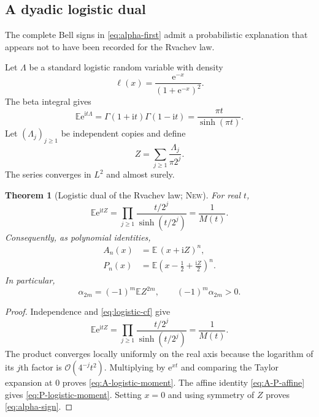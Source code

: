 \documentclass[11pt,oneside]{article}
\theoremstyle{frontier}
\newtheorem{theorem}{Theorem}[section]
\theoremstyle{definition}
\theoremstyle{remark}
\newcommand{\e}{\mathrm e}
\newcommand{\ii}{\mathrm i}
\newcommand{\BigO}{\mathcal O}
\newcommand{\statusnew}{\textsc{New}}
\begin{document}
\subsection{A dyadic logistic dual}

The complete Bell signs in \eqref{eq:alpha-first} admit a probabilistic explanation that appears not
to have been recorded for the Rvachev law.

Let $\Lambda$ be a standard logistic random variable with density
\begin{equation}
 \ell(x)=\frac{\e^{-x}}{(1+\e^{-x})^2}.
 \label{eq:logistic-density}
\end{equation}
The beta integral gives
\begin{equation}
 \mathbb E\e^{\ii t\Lambda}
 =\Gamma(1+\ii t)\Gamma(1-\ii t)
 =\frac{\pi t}{\sinh(\pi t)}.
 \label{eq:logistic-cf}
\end{equation}
Let $(\Lambda_j)_{j\ge1}$ be independent copies and define
\begin{equation}
 Z=\sum_{j\ge1}\frac{\Lambda_j}{\pi2^j}.
 \label{eq:Z-logistic}
\end{equation}
The series converges in $L^2$ and almost surely.

\begin{theorem}[Logistic dual of the Rvachev law; \statusnew]
\label{thm:logistic-dual}
For real $t$,
\begin{equation}
 \boxed{
 \mathbb E\e^{\ii tZ}
 =\prod_{j\ge1}\frac{t/2^j}{\sinh(t/2^j)}
 =\frac1{M(t)}.
 }
 \label{eq:Z-cf}
\end{equation}
Consequently, as polynomial identities,
\begin{align}
 A_n(x)&=\mathbb E\,(x+\ii Z)^n,
 \label{eq:A-logistic-moment}\\
 P_n(x)&=\mathbb E\left(x-\frac12+\frac{\ii Z}{2}\right)^n.
 \label{eq:P-logistic-moment}
\end{align}
In particular,
\begin{equation}
 \boxed{
 \alpha_{2m}=(-1)^m\mathbb E Z^{2m},
 \qquad (-1)^m\alpha_{2m}>0.
 }
 \label{eq:alpha-sign}
\end{equation}
\end{theorem}

\begin{proof}
Independence and \eqref{eq:logistic-cf} give
\[
 \mathbb E\e^{\ii tZ}
 =\prod_{j\ge1}
 \frac{t/2^j}{\sinh(t/2^j)}=\frac1{M(t)}.
\]
The product converges locally uniformly on the real axis because the logarithm of its $j$th factor
is $\BigO(4^{-j}t^2)$.  Multiplying by $\e^{xt}$ and comparing the Taylor expansion at $0$ proves
\eqref{eq:A-logistic-moment}.  The affine identity \eqref{eq:A-P-affine} gives
\eqref{eq:P-logistic-moment}.  Setting $x=0$ and using symmetry of $Z$ proves
\eqref{eq:alpha-sign}.
\end{proof}
\end{document}
